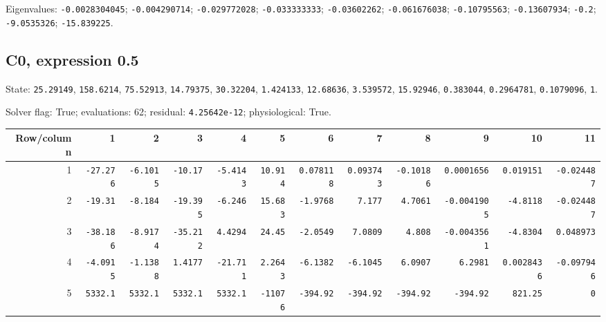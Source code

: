 \begin{landscape}
{\scriptsize Eigenvalues: \texttt{-0.0028304045}; \texttt{-0.004290714}; \texttt{-0.029772028}; \texttt{-0.033333333}; \texttt{-0.03602262}; \texttt{-0.061676038}; \texttt{-0.10795563}; \texttt{-0.13607934}; \texttt{-0.2}; \texttt{-9.0535326}; \texttt{-15.839225}.\par}

\subsection*{C0, expression 0.5}
{\scriptsize State: \texttt{25.29149}, \texttt{158.6214}, \texttt{75.52913}, \texttt{14.79375}, \texttt{30.32204}, \texttt{1.424133}, \texttt{12.68636}, \texttt{3.539572}, \texttt{15.92946}, \texttt{0.383044}, \texttt{0.2964781}, \texttt{0.1079096}, \texttt{1}.\par

Solver flag: True; evaluations: 62; residual: \texttt{4.25642e-12}; physiological: True.\par}

\begingroup\scriptsize\setlength{\tabcolsep}{3pt}\centering
\begin{tabular}{rrrrrrrrrrrr}\toprule

Row/column & 1 & 2 & 3 & 4 & 5 & 6 & 7 & 8 & 9 & 10 & 11 \\ \midrule

1 & \texttt{-27.276} & \texttt{-6.1015} & \texttt{-10.17} & \texttt{-5.4143} & \texttt{10.914} & \texttt{0.078118} & \texttt{0.093743} & \texttt{-0.10186} & \texttt{0.0001656} & \texttt{0.019151} & \texttt{-0.024487} \\

2 & \texttt{-19.31} & \texttt{-8.184} & \texttt{-19.395} & \texttt{-6.246} & \texttt{15.683} & \texttt{-1.9768} & \texttt{7.177} & \texttt{4.7061} & \texttt{-0.0041905} & \texttt{-4.8118} & \texttt{-0.024487} \\

3 & \texttt{-38.186} & \texttt{-8.9174} & \texttt{-35.212} & \texttt{4.4294} & \texttt{24.45} & \texttt{-2.0549} & \texttt{7.0809} & \texttt{4.808} & \texttt{-0.0043561} & \texttt{-4.8304} & \texttt{0.048973} \\

4 & \texttt{-4.0915} & \texttt{-1.1388} & \texttt{1.4177} & \texttt{-21.711} & \texttt{2.2643} & \texttt{-6.1382} & \texttt{-6.1045} & \texttt{6.0907} & \texttt{6.2981} & \texttt{0.0028436} & \texttt{-0.097946} \\

5 & \texttt{5332.1} & \texttt{5332.1} & \texttt{5332.1} & \texttt{5332.1} & \texttt{-11076} & \texttt{-394.92} & \texttt{-394.92} & \texttt{-394.92} & \texttt{-394.92} & \texttt{821.25} & \texttt{0} \\


\end{tabular}
\end{landscape}
